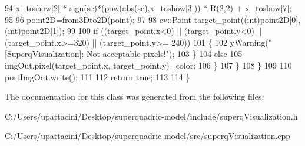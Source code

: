\begin{DoxyCode}
94                                 x\_toshow[2] * sign(se)*(pow(abs(se),x\_toshow[3])) * R(2,2) + x\_toshow[7];
95 
96                  point2D=from3Dto2D(point);
97 
98                  cv::Point target\_point((\textcolor{keywordtype}{int})point2D[0],(\textcolor{keywordtype}{int})point2D[1]);
99 
100                  \textcolor{keywordflow}{if} ((target\_point.x<0) || (target\_point.y<0) || (target\_point.x>=320) || (target\_point.y>=
      240))
101                  \{
102                      yWarning(\textcolor{stringliteral}{"[SuperqVisualization]: Not acceptable pixels!"});
103                  \}
104                  \textcolor{keywordflow}{else}
105                     imgOut.pixel(target\_point.x, target\_point.y)=color;
106              \}
107          \}
108     \}
109 
110     portImgOut.write();
111 
112     \textcolor{keywordflow}{return} \textcolor{keyword}{true};
113 
114 \}
\end{DoxyCode}


The documentation for this class was generated from the following files\+:\begin{DoxyCompactItemize}
\item 
C\+:/\+Users/upattacini/\+Desktop/superquadric-\/model/include/superq\+Visualization.\+h\item 
C\+:/\+Users/upattacini/\+Desktop/superquadric-\/model/src/superq\+Visualization.\+cpp\end{DoxyCompactItemize}
